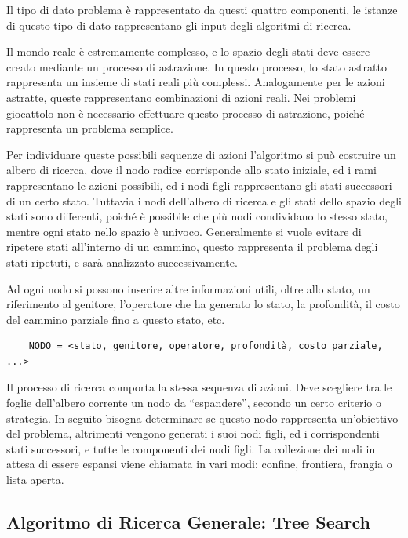 \documentclass{article}
\numberwithin{equation}{subsection}
\begin{document}
Il tipo di dato problema è rappresentato da questi quattro componenti, le istanze di questo 
tipo di dato rappresentano gli input degli algoritmi di ricerca. 


Il mondo reale è estremamente complesso, e lo spazio degli stati deve essere creato mediante un 
processo di astrazione. In questo processo, lo stato astratto rappresenta un insieme di 
stati reali più complessi. Analogamente per le azioni astratte, queste rappresentano combinazioni 
di azioni reali. Nei problemi giocattolo non è necessario effettuare questo processo di astrazione, 
poiché rappresenta un problema semplice. 


Per individuare queste possibili sequenze di azioni l'algoritmo si può costruire un albero di 
ricerca, dove il nodo radice corrisponde allo stato iniziale, ed i rami rappresentano 
le azioni possibili, ed i nodi figli rappresentano gli stati successori di un certo stato. 
Tuttavia i nodi dell'albero di ricerca e gli stati dello spazio degli stati sono differenti, poiché 
è possibile che più nodi condividano lo stesso stato, mentre ogni stato nello spazio è univoco. 
Generalmente si vuole evitare di ripetere stati all'interno di un cammino, questo rappresenta il 
problema degli stati ripetuti, e sarà analizzato successivamente. 

Ad ogni nodo si possono inserire altre informazioni utili, oltre allo stato, un riferimento al 
genitore, l'operatore che ha generato lo stato, la profondità, il costo del cammino parziale 
fino a questo stato, etc. 
\begin{verbatim}
    NODO = <stato, genitore, operatore, profondità, costo parziale, ...>
\end{verbatim}

Il processo di ricerca comporta la stessa sequenza di azioni. Deve scegliere tra le foglie 
dell'albero corrente un nodo da ``espandere'', secondo un certo criterio o strategia. 
In seguito bisogna determinare se questo nodo rappresenta un'obiettivo del problema, 
altrimenti vengono generati i suoi nodi figli, ed i corrispondenti stati successori, e tutte 
le componenti dei nodi figli. 
La collezione dei nodi in attesa di essere espansi viene chiamata in vari modi: confine, 
frontiera, frangia o lista aperta. 

\subsection{Algoritmo di Ricerca Generale: Tree Search}
\end{document}
